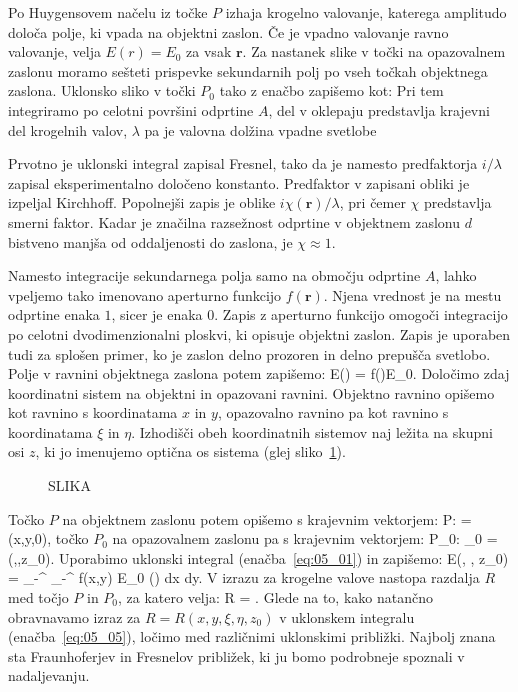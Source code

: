 Po Huygensovem načelu iz točke $P$ izhaja krogelno valovanje, katerega
amplitudo določa polje, ki vpada na objektni zaslon. Če je vpadno valovanje
ravno valovanje, velja $E(r) = E_0$ za vsak $\mathbf{r}$. Za nastanek slike
v točki na opazovalnem zaslonu moramo sešteti prispevke sekundarnih
polj po vseh točkah objektnega zaslona. Uklonsko sliko v točki $P_0$ 
tako z enačbo zapišemo kot:
Pri tem integriramo po celotni površini odprtine $A$, del v oklepaju predstavlja
krajevni del krogelnih valov, $\lambda$ pa je valovna dolžina vpadne svetlobe
\begin{remark}
Prvotno je uklonski integral zapisal Fresnel, tako da je namesto predfaktorja 
$i/\lambda$ zapisal eksperimentalno določeno konstanto. Predfaktor v zapisani
obliki je izpeljal Kirchhoff. Popolnejši zapis je oblike $i \chi(\mathbf{r})/\lambda$,
pri čemer $\chi$ predstavlja smerni faktor. Kadar je značilna razsežnost odprtine v 
objektnem zaslonu $d$ bistveno manjša od oddaljenosti do zaslona, 
je $\chi \approx 1$.
\end{remark}
Namesto integracije sekundarnega polja samo na območju odprtine $A$, lahko vpeljemo
tako imenovano aperturno funkcijo $f(\mathbf{r})$. Njena vrednost je na mestu odprtine enaka $1$,
sicer je enaka $0$. Zapis z aperturno funkcijo omogoči integracijo po celotni dvodimenzionalni
ploskvi, ki opisuje objektni zaslon. Zapis je uporaben tudi za splošen primer, ko je zaslon
delno prozoren in delno prepušča svetlobo. Polje v ravnini objektnega zaslona potem zapišemo:
\beq
E() = f()E_0.
\label{eq:05_02}
\eeq
Določimo zdaj koordinatni sistem na objektni in opazovani ravnini. Objektno ravnino
opišemo kot ravnino s koordinatama $x$ in $y$, opazovalno ravnino pa kot ravnino
s koordinatama $\xi$ in $\eta$. Izhodišči obeh koordinatnih sistemov naj ležita 
na skupni osi $z$, ki jo imenujemo optična os sistema (glej sliko~\ref{fig:05_koordinate}).
\begin{figure}[ht]
\centering
\def\svgwidth{120truemm} 
%
\caption{SLIKA}
\label{fig:05_koordinate}
\end{figure}

Točko $P$ na objektnem zaslonu potem opišemo s krajevnim vektorjem:
\beq
P:  = (x,y,0),
\label{eq:05_03}
\eeq
točko $P_0$ na opazovalnem zaslonu pa s krajevnim vektorjem:
\beq
P_0: _0 = (\xi,\eta,z_0).
\label{eq:05_04}
\eeq
Uporabimo uklonski integral (enačba~\ref{eq:05_01}) in zapišemo:
\beq
E(\xi, \eta, z_0) =  \int_{-\infty}^{\infty}
\int_{-\infty}^{\infty} f(x,y) E_0 \left(\right) dx dy.
\label{eq:05_05}
\eeq
V izrazu za krogelne valove nastopa razdalja $R$ med točjo $P$ in $P_0$, za
katero velja:
\beq
R = .
\label{eq:05_06}
\eeq
Glede na to, kako natančno obravnavamo izraz za $R = R(x,y,\xi, \eta, z_0)$ v uklonskem
integralu (enačba~\ref{eq:05_05}), ločimo med različnimi uklonskimi približki. Najbolj 
znana sta Fraunhoferjev in Fresnelov približek, ki ju bomo podrobneje spoznali v nadaljevanju.

